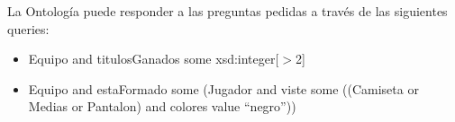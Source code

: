 \documentclass{article}
\begin{document}
La Ontología puede responder a las preguntas pedidas a través de las siguientes queries:
\begin{itemize}[itemsep=2pt, topsep=0pt]
 \item Equipo and titulosGanados some xsd:integer[$>$2]
 \item Equipo and estaFormado some (Jugador and viste some ((Camiseta or Medias or Pantalon) and colores value \textquotedblleft negro\textquotedblright))
\end{itemize}
\end{document}
